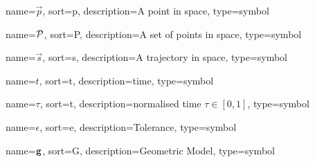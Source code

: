 
	{%
		name={\ensuremath{\vec{p}}},
		sort=p,
		description=A point in space,
		type=symbol
	}
	\newcommand{\point}{\gls{sym:point}}

	{%
		name={\ensuremath{\set{P}}},
		sort=P,
		description=A set of points in space,
		type=symbol
	}
	\newcommand{\setofpoints}{\gls{sym:setofpoints}}

	{%
		name={\ensuremath{\vec{s}}},
		sort=s,
		description=A trajectory in space,
		type=symbol
	}
	\newcommand{\traj}{\gls{sym:traj}}


	{%
		name={\ensuremath{t}},
		sort=t,
		description=time,
		type=symbol
	}
	\newcommand{\timesym}{\gls{sym:time}}

	{%
		name={\ensuremath{\tau}},
		sort=t,
		description=normalised time \ensuremath{\tau \in [0, 1]},
		type=symbol
	}
	\newcommand{\timenorm}{\gls{sym:timenorm}}

	{%
		name={\ensuremath{\epsilon}},
		sort=e,
		description=Tolerance,
		type=symbol
	}
	\newcommand{\tol}{\gls{sym:tolerance}}

	{%
		name={\ensuremath{\vecfunc{g}}},
		sort=G,
		description=Geometric Model,
		type=symbol
	}
	\newcommand{\geometricmodel}{\gls{sym:geometricmodel}}

